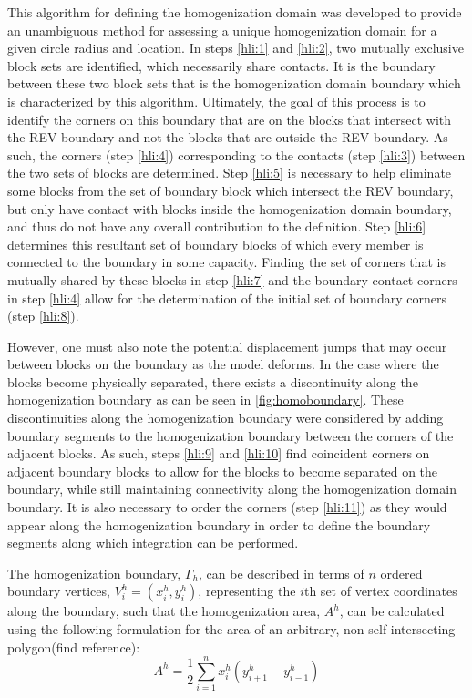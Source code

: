 This algorithm for defining the homogenization domain was developed
to provide an unambiguous method for assessing a unique homogenization
domain for a given circle radius and location. In steps \ref{hli:1}
and \ref{hli:2}, two mutually exclusive block sets are identified,
which necessarily share contacts. It is the boundary between these
two block sets that is the homogenization domain boundary which is
characterized by this algorithm. Ultimately, the goal of this process
is to identify the corners on this boundary that are on the blocks
that intersect with the REV boundary and not the blocks that are outside
the REV boundary. As such, the corners (step \ref{hli:4}) corresponding
to the contacts (step \ref{hli:3}) between the two sets of blocks
are determined. Step \ref{hli:5} is necessary to help eliminate some
blocks from the set of boundary block which intersect the REV boundary,
but only have contact with blocks inside the homogenization domain
boundary, and thus do not have any overall contribution to the definition.
Step \ref{hli:6} determines this resultant set of boundary blocks
of which every member is connected to the boundary in some capacity.
Finding the set of corners that is mutually shared by these blocks
in step \ref{hli:7} and the boundary contact corners in step \ref{hli:4}
allow for the determination of the initial set of boundary corners
(step \ref{hli:8}).

However, one must also note the potential displacement jumps that
may occur between blocks on the boundary as the model deforms. In
the case where the blocks become physically separated, there exists
a discontinuity along the homogenization boundary as can be seen in
\ref{fig:homoboundary}. These discontinuities along the homogenization
boundary were considered by adding boundary segments to the homogenization
boundary between the corners of the adjacent blocks. As such, steps
\ref{hli:9} and \ref{hli:10} find coincident corners on adjacent
boundary blocks to allow for the blocks to become separated on the
boundary, while still maintaining connectivity along the homogenization
domain boundary. It is also necessary to order the corners (step \ref{hli:11})
as they would appear along the homogenization boundary in order to
define the boundary segments along which integration can be performed.

The homogenization boundary, $\Gamma_{h}$, can be described in terms
of $n$ ordered boundary vertices, $V_{i}^{h}=(x_{i}^{h},y_{i}^{h})$,
representing the $i$th set of vertex coordinates along the boundary,
such that the homogenization area, $A^{h}$, can be calculated using
the following formulation for the area of an arbitrary, non-self-intersecting
polygon(find reference): 
\begin{equation}
A^{h}=\dfrac{1}{2}\sum_{i=1}^{n}x_{i}^{h}(y_{i+1}^{h}-y_{i-1}^{h})\label{eqn:hom1}
\end{equation}


